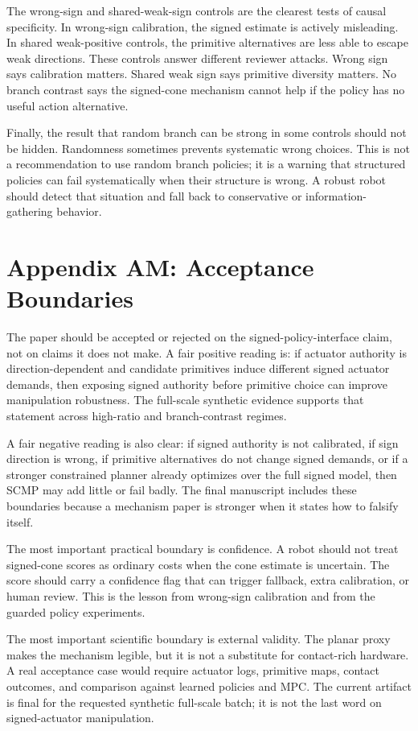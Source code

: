 \documentclass{article}
\begin{document}
The wrong-sign and shared-weak-sign controls are the clearest tests of causal specificity. In wrong-sign calibration, the signed estimate is actively misleading. In shared weak-positive controls, the primitive alternatives are less able to escape weak directions. These controls answer different reviewer attacks. Wrong sign says calibration matters. Shared weak sign says primitive diversity matters. No branch contrast says the signed-cone mechanism cannot help if the policy has no useful action alternative.

Finally, the result that random branch can be strong in some controls should not be hidden. Randomness sometimes prevents systematic wrong choices. This is not a recommendation to use random branch policies; it is a warning that structured policies can fail systematically when their structure is wrong. A robust robot should detect that situation and fall back to conservative or information-gathering behavior.

\section*{Appendix AM: Acceptance Boundaries}

The paper should be accepted or rejected on the signed-policy-interface claim, not on claims it does not make. A fair positive reading is: if actuator authority is direction-dependent and candidate primitives induce different signed actuator demands, then exposing signed authority before primitive choice can improve manipulation robustness. The full-scale synthetic evidence supports that statement across high-ratio and branch-contrast regimes.

A fair negative reading is also clear: if signed authority is not calibrated, if sign direction is wrong, if primitive alternatives do not change signed demands, or if a stronger constrained planner already optimizes over the full signed model, then SCMP may add little or fail badly. The final manuscript includes these boundaries because a mechanism paper is stronger when it states how to falsify itself.

The most important practical boundary is confidence. A robot should not treat signed-cone scores as ordinary costs when the cone estimate is uncertain. The score should carry a confidence flag that can trigger fallback, extra calibration, or human review. This is the lesson from wrong-sign calibration and from the guarded policy experiments.

The most important scientific boundary is external validity. The planar proxy makes the mechanism legible, but it is not a substitute for contact-rich hardware. A real acceptance case would require actuator logs, primitive maps, contact outcomes, and comparison against learned policies and MPC. The current artifact is final for the requested synthetic full-scale batch; it is not the last word on signed-actuator manipulation.
\end{document}
